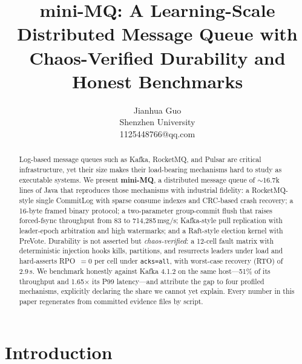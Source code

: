 \documentclass[letterpaper,twocolumn,10pt]{article}
\begin{document}

\date{}

\title{\Large \bf mini-MQ: A Learning-Scale Distributed Message Queue with
  Chaos-Verified Durability and Honest Benchmarks}

\author{
{\rm Jianhua Guo}\\
Shenzhen University\\
1125448766@qq.com
}

\maketitle

\begin{abstract}
Log-based message queues such as Kafka, RocketMQ, and Pulsar are critical
infrastructure, yet their size makes their load-bearing mechanisms hard to
study as executable systems. We present \textbf{mini-MQ}, a distributed
message queue of ${\sim}16.7$k lines of Java that reproduces those mechanisms
with industrial fidelity: a RocketMQ-style single CommitLog with sparse
consume indexes and CRC-based crash recovery; a 16-byte framed binary
protocol; a two-parameter group-commit flush that raises forced-fsync
throughput from 83 to 714{,}285\,msg/s; Kafka-style pull replication with
leader-epoch arbitration and high watermarks; and a Raft-style election
kernel with PreVote. Durability is not asserted but \emph{chaos-verified}:
a 12-cell fault matrix with deterministic injection hooks kills, partitions,
and resurrects leaders under load and hard-asserts RPO~$=0$ per cell under
\texttt{acks=all}, with worst-case recovery (RTO) of 2.9\,s. We benchmark
honestly against Kafka 4.1.2 on the same host---51\% of its throughput and
1.65$\times$ its P99 latency---and attribute the gap to four profiled
mechanisms, explicitly declaring the share we cannot yet explain. Every
number in this paper regenerates from committed evidence files by script.

\end{abstract}

\section{Introduction}
\end{document}
